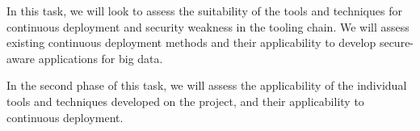 \begin{Workpackage}{\thewpno}
\begin{Task}
In this task, we will look to assess the suitability of the tools and techniques for continuous deployment and security weakness in the tooling chain.  We will assess existing  continuous deployment  methods and their applicability to develop secure-aware applications for big data.

In the second phase of this task, we will assess the applicability of the individual tools and techniques developed on the \TheProject{} project, and their applicability to continuous deployment. 
\end{Task}

%	
%	

\begin{Task}
	
	\TaskResults{%
	}
	\TaskHeader{}
	

\end{Task}
\end{Workpackage}
